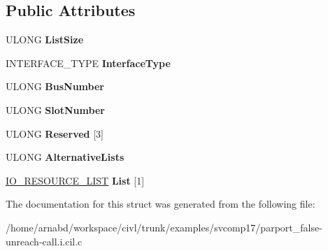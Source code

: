 \subsection*{Public Attributes}
\begin{DoxyCompactItemize}
\item 
\hypertarget{struct__IO__RESOURCE__REQUIREMENTS__LIST_a75d5e97f2a2065baf247bc5647448609}{}U\+L\+O\+N\+G {\bfseries List\+Size}\label{struct__IO__RESOURCE__REQUIREMENTS__LIST_a75d5e97f2a2065baf247bc5647448609}

\item 
\hypertarget{struct__IO__RESOURCE__REQUIREMENTS__LIST_a284d7c8cf7e657a5d59ba4554b7ab60a}{}I\+N\+T\+E\+R\+F\+A\+C\+E\+\_\+\+T\+Y\+P\+E {\bfseries Interface\+Type}\label{struct__IO__RESOURCE__REQUIREMENTS__LIST_a284d7c8cf7e657a5d59ba4554b7ab60a}

\item 
\hypertarget{struct__IO__RESOURCE__REQUIREMENTS__LIST_aec6d76ca6c87257b3f510ca049d9fad7}{}U\+L\+O\+N\+G {\bfseries Bus\+Number}\label{struct__IO__RESOURCE__REQUIREMENTS__LIST_aec6d76ca6c87257b3f510ca049d9fad7}

\item 
\hypertarget{struct__IO__RESOURCE__REQUIREMENTS__LIST_a36bcf27c142c034518b4c2f34f7d577e}{}U\+L\+O\+N\+G {\bfseries Slot\+Number}\label{struct__IO__RESOURCE__REQUIREMENTS__LIST_a36bcf27c142c034518b4c2f34f7d577e}

\item 
\hypertarget{struct__IO__RESOURCE__REQUIREMENTS__LIST_a12748399e719c0d9aa86400747c417b2}{}U\+L\+O\+N\+G {\bfseries Reserved} \mbox{[}3\mbox{]}\label{struct__IO__RESOURCE__REQUIREMENTS__LIST_a12748399e719c0d9aa86400747c417b2}

\item 
\hypertarget{struct__IO__RESOURCE__REQUIREMENTS__LIST_a4aa47573d3c5a0475e2638d362340d21}{}U\+L\+O\+N\+G {\bfseries Alternative\+Lists}\label{struct__IO__RESOURCE__REQUIREMENTS__LIST_a4aa47573d3c5a0475e2638d362340d21}

\item 
\hypertarget{struct__IO__RESOURCE__REQUIREMENTS__LIST_af1d7323c387ce01d54795372a4e19653}{}\hyperlink{struct__IO__RESOURCE__LIST}{I\+O\+\_\+\+R\+E\+S\+O\+U\+R\+C\+E\+\_\+\+L\+I\+S\+T} {\bfseries List} \mbox{[}1\mbox{]}\label{struct__IO__RESOURCE__REQUIREMENTS__LIST_af1d7323c387ce01d54795372a4e19653}

\end{DoxyCompactItemize}


The documentation for this struct was generated from the following file\+:\begin{DoxyCompactItemize}
\item 
/home/arnabd/workspace/civl/trunk/examples/svcomp17/parport\+\_\+false-\/unreach-\/call.\+i.\+cil.\+c\end{DoxyCompactItemize}
